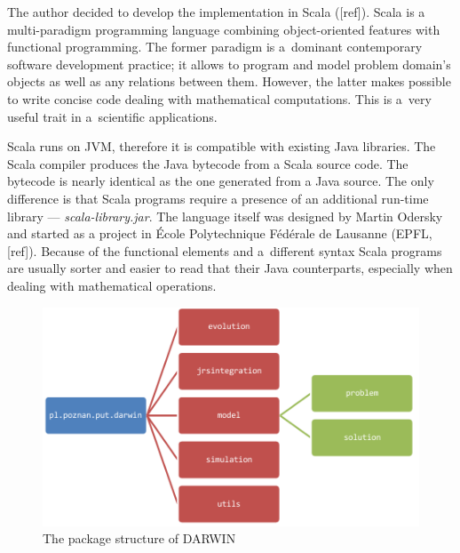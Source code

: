 The author decided to develop the implementation in Scala ([ref]). Scala is a
multi-paradigm programming language combining object-oriented features with
functional programming. The former paradigm is a~dominant contemporary
software development practice; it allows to program and model problem domain's
objects as well as any relations between them. However, the latter makes
possible to write concise code dealing with mathematical computations. This is
a~very useful trait in a~scientific applications.

Scala runs on JVM, therefore it is compatible with existing Java
libraries. The Scala compiler produces the Java bytecode from a Scala source
code. The bytecode is nearly identical as the one generated from a Java
source. The only difference is that Scala programs require a presence of an
additional run-time library --- \textit{scala-library.jar}. The language
itself was designed by Martin Odersky and started as a project in École
Polytechnique Fédérale de Lausanne (EPFL, [ref]). Because of the functional
elements and a~different syntax Scala programs are usually sorter and easier to
read that their Java counterparts, especially when dealing with mathematical
operations.

\begin{figure}
  \centering \includegraphics[scale=0.9]{img/packages}
  \caption{The package structure of DARWIN}
  \label{packages}
\end{figure}

